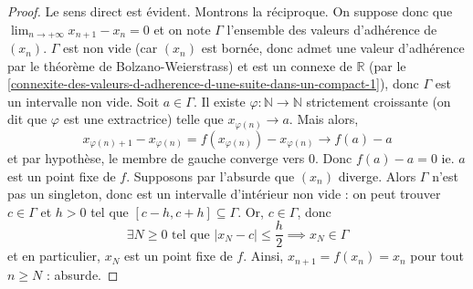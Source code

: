  \begin{proof}
    Le sens direct est évident. Montrons la réciproque. On suppose donc que $\lim_{n \rightarrow +\infty } x_{n+1} - x_n = 0$ et on note $\Gamma$ l'ensemble des valeurs d'adhérence de $(x_n)$. $\Gamma$ est non vide (car $(x_n)$ est bornée, donc admet une valeur d'adhérence par le théorème de Bolzano-Weierstrass) et est un connexe de $\mathbb{R}$ (par le \cref{connexite-des-valeurs-d-adherence-d-une-suite-dans-un-compact-1}), donc $\Gamma$ est un intervalle non vide.
    \newpar
    Soit $a \in \Gamma$. Il existe $\varphi : \mathbb{N} \rightarrow \mathbb{N}$ strictement croissante (on dit que $\varphi$ est une extractrice) telle que $x_{\varphi(n)} \longrightarrow a$. Mais alors,
    \[ x_{\varphi(n) + 1} - x_{\varphi(n)} = f(x_{\varphi(n)}) - x_{\varphi(n)} \longrightarrow f(a) - a \]
    et par hypothèse, le membre de gauche converge vers $0$. Donc $f(a) - a = 0$ ie. $a$ est un point fixe de $f$.
    \newpar
    Supposons par l'absurde que $(x_n)$ diverge. Alors $\Gamma$ n'est pas un singleton, donc est un intervalle d'intérieur non vide : on peut trouver $c \in \Gamma$ et $h > 0$ tel que $[c - h, c + h] \subseteq \Gamma$.
    \newpar
    Or, $c \in \Gamma$, donc
    \[ \exists N \geq 0 \text{ tel que } |x_N - c| \leq \frac{h}{2} \implies x_N \in \Gamma \]
    et en particulier, $x_N$ est un point fixe de $f$. Ainsi, $x_{n+1} = f(x_n) = x_n$ pour tout $n \geq N$ : absurde.
  \end{proof}

